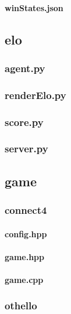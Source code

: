 \documentclass[12pt]{article}
\newcommand{\incFile}[2]{\label{code:#2}\newpage}
\begin{document}
\paragraph{winStates.json}											\incFile{python}{Clients/pyClient/winStates.json}

\subsection{elo}																%
\subsubsection{agent.py}												\incFile{python}{elo/agent.py}
\subsubsection{renderElo.py}										\incFile{python}{elo/renderElo.py}
\subsubsection{score.py}												\incFile{python}{elo/score.py}
\subsubsection{server.py}												\incFile{python}{elo/server.py}

\subsection{game}															%
\subsubsection{connect4}
\paragraph{config.hpp}													\incFile{C++}{games/connect4/config.hpp}
\paragraph{game.hpp}													\incFile{C++}{games/connect4/game.hpp}
\paragraph{game.cpp}													\incFile{C++}{games/connect4/game.cpp}
\subsubsection{othello}													%
\end{document}
